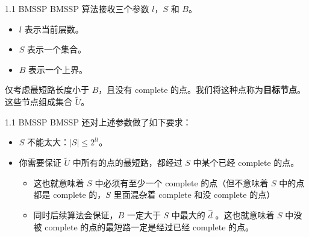 \documentclass{beamer}
\begin{document}
\begin{frame}{1.1 BMSSP}
  BMSSP 算法接收三个参数 $l$，$S$ 和 $B$。

  \pause
  \begin{itemize}
    \item $l$ 表示当前层数。
    \item $S$ 表示一个集合。
    \item $B$ 表示一个上界。
  \end{itemize}

  \pause\vspace{0.35em}
    仅考虑最短路长度小于 $B$，且没有 complete 的点。我们将这种点称为\textbf{目标节点}。这些节点组成集合 $\widetilde{U}$。
\end{frame}
\begin{frame}{1.1 BMSSP}
  BMSSP 还对上述参数做了如下要求：

  \pause
  \begin{itemize}
    \item $S$ 不能太大：$|S| \le 2^{lt}$。
    \pause
    \item 你需要保证 $\widetilde{U}$ 中所有的点的最短路，都经过 $S$ 中某个已经 complete 的点。
    \pause
      \begin{itemize}
        \item 这也就意味着 $S$ 中必须有至少一个 complete 的点（但不意味着 $S$ 中的点都是 complete 的，$S$ 里面混杂着 complete 和没 complete 的点）
        \pause
        \item 同时后续算法会保证，$B$ 一定大于 $S$ 中最大的 $\hat{d}$ 。这也就意味着 $S$ 中没被 complete 的点的最短路一定是经过已经 complete 的点。
      \end{itemize}
  \end{itemize}
\end{frame}
\end{document}
